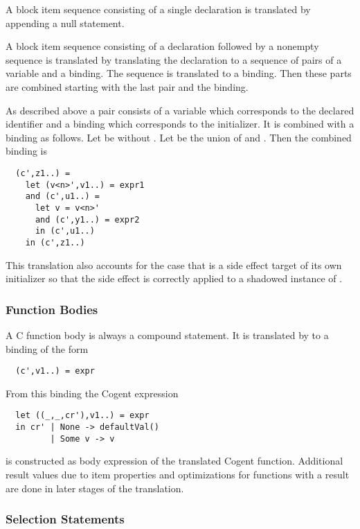 A block item sequence consisting of a single declaration is translated by appending a null statement.

A block item sequence consisting of a declaration  followed by a nonempty sequence  is translated by translating 
the declaration to a sequence of pairs of a variable and a binding. The sequence  is translated to a binding. Then 
these parts are combined starting with the last pair and the binding.

As described above a pair consists of a variable  which corresponds to the declared identifier and a binding 
 which corresponds to the initializer. It is combined with a binding  as follows. 
Let  be  without . Let  be the union of  and . Then the
combined binding is
\begin{verbatim}
  (c',z1..) = 
    let (v<n>',v1..) = expr1
    and (c',u1..) = 
      let v = v<n>'
      and (c',y1..) = expr2
      in (c',u1..)
    in (c',z1..)
\end{verbatim}
This translation also accounts for the case that  is a side effect target of its own initializer so that the side effect is
correctly applied to a shadowed instance of .

\subsubsection{Function Bodies}

A C function body is always a compound statement. It is translated by  to a 
binding of the form
\begin{verbatim}
  (c',v1..) = expr
\end{verbatim}

From this binding the Cogent expression
\begin{verbatim}
  let ((_,_,cr'),v1..) = expr
  in cr' | None -> defaultVal()
         | Some v -> v
\end{verbatim}
is constructed as body expression of the translated Cogent function. Additional result values due to item 
properties and optimizations for functions with a  result are done in  later stages of the translation.

\subsubsection{Selection Statements}

